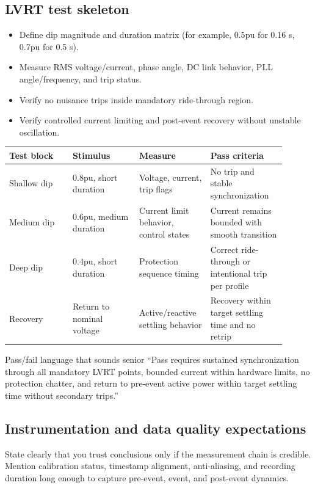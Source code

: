 \documentclass[11pt]{article}
\newcommand{\pu}{\mathrm{pu}}
\begin{document}
\subsection{LVRT test skeleton}
\begin{itemize}
  \item Define dip magnitude and duration matrix (for example, \(0.5\pu\) for 0.16 s, \(0.7\pu\) for 0.5 s).
  \item Measure RMS voltage/current, phase angle, DC link behavior, PLL angle/frequency, and trip status.
  \item Verify no nuisance trips inside mandatory ride-through region.
  \item Verify controlled current limiting and post-event recovery without unstable oscillation.
\end{itemize}

\begin{table}[h]
\centering
\begin{tabular}{p{0.21\linewidth}p{0.22\linewidth}p{0.22\linewidth}p{0.25\linewidth}}
\toprule
Test block & Stimulus & Measure & Pass criteria \\
\midrule
Shallow dip & \(0.8\pu\), short duration & Voltage, current, trip flags & No trip and stable synchronization \\
Medium dip & \(0.6\pu\), medium duration & Current limit behavior, control states & Current remains bounded with smooth transition \\
Deep dip & \(0.4\pu\), short duration & Protection sequence timing & Correct ride-through or intentional trip per profile \\
Recovery & Return to nominal voltage & Active/reactive settling behavior & Recovery within target settling time and no retrip \\
\bottomrule
\end{tabular}
\end{table}

\begin{examplebox}{Pass/fail language that sounds senior}
``Pass requires sustained synchronization through all mandatory LVRT points,
bounded current within hardware limits, no protection chatter, and return to
pre-event active power within target settling time without secondary trips.''
\end{examplebox}

\subsection{Instrumentation and data quality expectations}
State clearly that you trust conclusions only if the measurement chain is
credible. Mention calibration status, timestamp alignment, anti-aliasing, and
recording duration long enough to capture pre-event, event, and post-event
dynamics.
\end{document}
